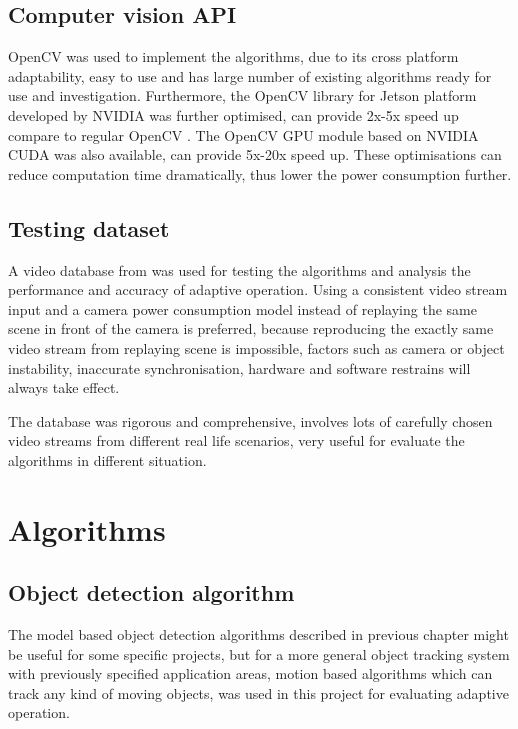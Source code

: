 \subsection{Computer vision API}

OpenCV \cite{opencv} was used to implement the algorithms, due to its cross platform adaptability, easy to use and has large number of existing algorithms ready for use and investigation. Furthermore, the OpenCV library for Jetson platform developed by NVIDIA was further optimised, can provide 2x-5x speed up compare to regular OpenCV \cite{NVIDIA:perf}. The OpenCV GPU module based on NVIDIA CUDA was also available, can provide 5x-20x speed up. These optimisations can reduce computation time dramatically, thus lower the power consumption further.

\subsection{Testing dataset}

A video database from \cite{goyette2012changedetection} was used for testing the algorithms and analysis the performance and accuracy of adaptive operation. Using a consistent video stream input and a camera power consumption model instead of replaying the same scene in front of the camera is preferred, because reproducing the exactly same video stream from replaying scene is impossible, factors such as camera or object instability, inaccurate synchronisation, hardware and software restrains will always take effect.

The database was rigorous and comprehensive, involves lots of carefully chosen video streams from different real life scenarios, very useful for evaluate the algorithms in different situation.

\section{Algorithms}

\subsection{Object detection algorithm}

The model based object detection algorithms described in previous chapter might be useful for some specific projects, but for a more general object tracking system with previously specified application areas, motion based algorithms which can track any kind of moving objects, was used in this project for evaluating adaptive operation.

